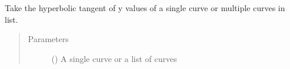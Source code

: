 \documentclass[letterpaper,10pt,english]{sphinxmanual}
\begin{document}
\begin{fulllineitems}
\label{\detokenize{pydv:pydvpy.tanh}}
Take the hyperbolic tangent of y values of a single curve or multiple curves in list.

\begin{sphinxVerbatim}[commandchars=\\\{\}]
  
\end{sphinxVerbatim}

\begin{sphinxVerbatim}[commandchars=\\\{\}]
\end{sphinxVerbatim}
\begin{quote}\begin{description}
\item[{Parameters}] \leavevmode
{} () \textendash{} A single curve or a list of curves

\end{description}\end{quote}

\end{fulllineitems}

\end{document}
